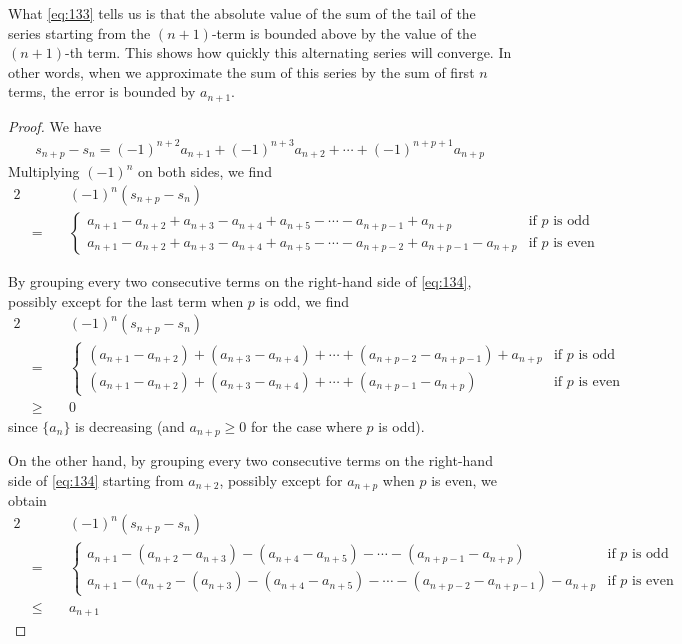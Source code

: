 \documentclass[thmcnt=section, 12pt]{my-elegantbook}
\begin{document}
\begin{note}
	What \eqref{eq:133} tells us is that 
	the absolute value of the
	sum of the tail of the series starting
	from the $(n+1)$-term is bounded above
	by the value of the $(n+1)$-th term.
	This shows how quickly this 
	alternating series will converge.
	In other words, when we approximate the sum
	of this series by the sum of first $n$ terms, 
	the error is bounded by $a_{n+1}$.
\end{note}

\begin{proof}
	We have 
	\begin{align*}
		s_{n+p} - s_n 
		= (-1)^{n+2} a_{n+1}
			+ (-1)^{n+3} a_{n+2}
			+ \cdots
			+ (-1)^{n+p+1} a_{n+p}
	\end{align*}
	Multiplying $(-1)^n$ on both sides, we find 
	\begin{alignat}{2}
		&& \; & (-1)^{n} (s_{n+p} - s_{n}) \nonumber \\
		& = & & \begin{cases}
			a_{n+1} - a_{n+2} + a_{n+3} - a_{n+4} + a_{n+5}
			- \cdots - a_{n+p-1} + a_{n+p} 
			&\text{if $p$ is odd} \\ 
			a_{n+1} - a_{n+2} + a_{n+3} - a_{n+4} + a_{n+5}
			- \cdots - a_{n+p-2} + a_{n+p-1} - a_{n+p} 
			&\text{if $p$ is even}
		\end{cases}
		\label{eq:134}
	\end{alignat}	
	
	By grouping every two consecutive terms on the 
	right-hand side of \eqref{eq:134}, 
	possibly except for the last term when $p$ is odd,
	we find 
	\begin{alignat*}{2}
		& & \; & (-1)^{n} (s_{n+p} - s_{n}) \\
		& = & & \begin{cases}
			(a_{n+1} - a_{n+2}) + (a_{n+3} - a_{n+4})
			+ \cdots + (a_{n+p-2} - a_{n+p-1}) + a_{n+p} 
			&\text{if $p$ is odd} \\ 
			(a_{n+1} - a_{n+2}) + (a_{n+3} - a_{n+4})
			+ \cdots + (a_{n+p-1} - a_{n+p}) 
			&\text{if $p$ is even}
		\end{cases} \\
		& \geq & & 0
	\end{alignat*}
	since $\{a_n\}$ is decreasing 
	(and $a_{n+p} \geq 0$ for the case where $p$ is odd).
	
	On the other hand,
	by grouping every two consecutive terms 
	on the right-hand side of \eqref{eq:134}
	starting from $a_{n+2}$,
	possibly except for $a_{n+p}$ when $p$ is even,
	we obtain
	\begin{alignat*}{2}
		& & \; & (-1)^{n} (s_{n+p} - s_{n}) \\
		& = & & \begin{cases}
			a_{n+1} - (a_{n+2} - a_{n+3}) - (a_{n+4} - a_{n+5})
			- \cdots - (a_{n+p-1} - a_{n+p}) 
			&\text{if $p$ is odd} \\ 
			a_{n+1} - (a_{n+2} - (a_{n+3}) - (a_{n+4} - a_{n+5})
			- \cdots - (a_{n+p-2} - a_{n+p-1}) - a_{n+p} 
			&\text{if $p$ is even}
		\end{cases} \\
		& \leq & & a_{n+1}
	\end{alignat*}
	

\end{proof}
\end{document}
